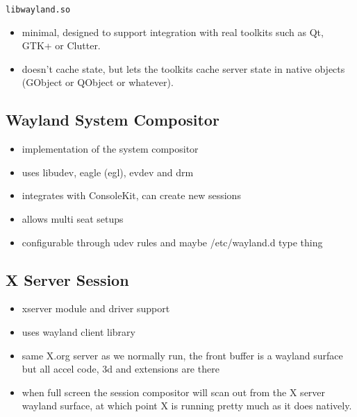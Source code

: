 \documentclass{article}
\begin{document}
\texttt{libwayland.so}

\begin{itemize}
\item minimal, designed to support integration with real toolkits such as
   Qt, GTK+ or Clutter.

\item doesn't cache state, but lets the toolkits cache server state in
   native objects (GObject or QObject or whatever).
\end{itemize}

\subsection{Wayland System Compositor}

\begin{itemize}
\item implementation of the system compositor

\item uses libudev, eagle (egl), evdev and drm

\item integrates with ConsoleKit, can create new sessions

\item allows multi seat setups

\item configurable through udev rules and maybe /etc/wayland.d type thing
\end{itemize}

\subsection{X Server Session}

\begin{itemize}
\item xserver module and driver support

\item uses wayland client library

\item same X.org server as we normally run, the front buffer is a wayland
   surface but all accel code, 3d and extensions are there

\item when full screen the session compositor will scan out from the X
   server wayland surface, at which point X is running pretty much as it
   does natively.
\end{itemize}
\end{document}
